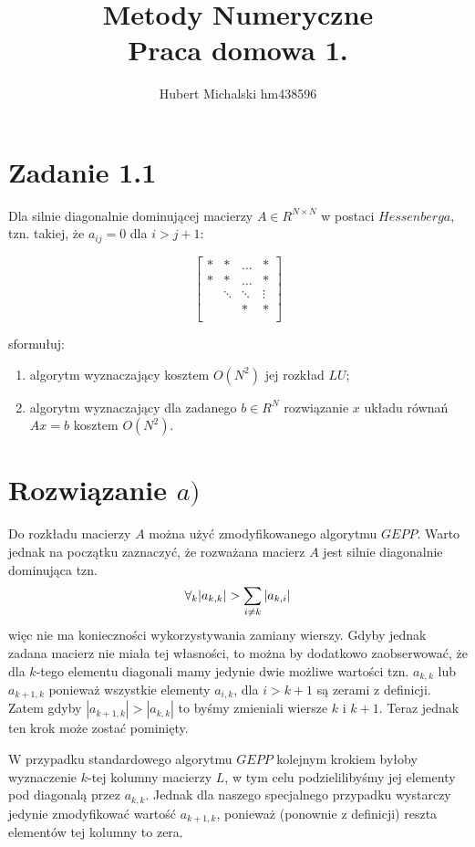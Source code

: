 \documentclass[a4paper]{article}
\title{\vspace{-1cm}
    Metody Numeryczne \\
    \large Praca domowa 1.
}
\author{
    Hubert Michalski hm438596 \\
}
\begin{document}
\maketitle

\section*{Zadanie 1.1}

Dla silnie diagonalnie dominującej macierzy $A \in R^{N \times N}$ w postaci $Hessenberga$, tzn. takiej, że $a_{ij}=0$ dla $i > j + 1$:

$$\begin{bmatrix}
* & * & \dots & * \\
* & * & \dots & * \\
& \ddots & \ddots & \vdots \\
&  & *     & * \\
\end{bmatrix}$$

sformułuj:
\begin{enumerate}[label=(\alph*)]
	\item
	      algorytm wyznaczający kosztem $O(N^2)$ jej rozkład $LU$;

	\item
	      algorytm wyznaczający dla zadanego $b \in R^N$ rozwiązanie $x$ układu równań $Ax=b$ kosztem $O(N^2)$.

\end{enumerate}


\section*{\large Rozwiązanie $a)$}

Do rozkładu macierzy $A$ można użyć zmodyfikowanego algorytmu $GEPP$. Warto jednak na początku zaznaczyć, że rozważana macierz $A$ jest silnie diagonalnie dominująca tzn. $$\forall_{k} \\|a_{k,k}|>\sum_{i \neq k}|a_{k,i}|$$ więc nie ma konieczności wykorzystywania zamiany wierszy. Gdyby jednak zadana macierz nie miała tej własności, to można by dodatkowo zaobserwować, że dla $k$-tego elementu diagonali mamy jedynie dwie możliwe wartości tzn. $a_{k,k}$ lub $a_{k+1,k}$ ponieważ wszystkie elementy $a_{i,k}$, dla $i > k + 1$ są zerami z definicji. Zatem gdyby $|a_{k+1,k}| > |a_{k,k}|$ to byśmy zmieniali wiersze $k$ i $k+1$. Teraz jednak ten krok może zostać pominięty.

W przypadku standardowego algorytmu $GEPP$ kolejnym krokiem byłoby wyznaczenie $k$-tej kolumny macierzy $L$, w tym celu podzielilibyśmy jej elementy pod diagonalą przez $a_{k,k}$. Jednak dla naszego specjalnego przypadku wystarczy jedynie zmodyfikować wartość $a_{k+1,k}$, ponieważ (ponownie z definicji) reszta elementów tej kolumny to zera.
\end{document}
